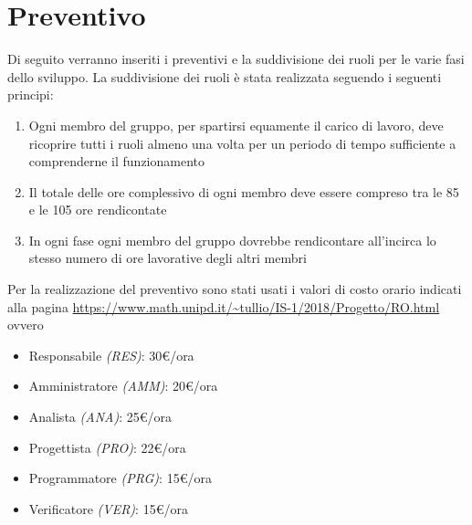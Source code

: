 	\section{Preventivo}
	Di seguito verranno inseriti i preventivi e la suddivisione dei ruoli per le varie fasi dello sviluppo. La suddivisione dei ruoli è stata realizzata seguendo i seguenti principi:
	\begin{enumerate}
		\item Ogni membro del gruppo, per spartirsi equamente il carico di lavoro, deve ricoprire tutti i ruoli almeno una volta per un periodo di tempo sufficiente a comprenderne il funzionamento
		\item Il totale delle ore complessivo di ogni membro deve essere compreso tra le 85 e le 105 ore rendicontate
		\item In ogni fase ogni membro del gruppo dovrebbe rendicontare all'incirca lo stesso numero di ore lavorative degli altri membri
	\end{enumerate} 
	Per la realizzazione del preventivo sono stati usati i valori di costo orario indicati alla pagina \url{https://www.math.unipd.it/~tullio/IS-1/2018/Progetto/RO.html} ovvero
	\begin{itemize}
		\item Responsabile \textit{(RES)}: 30\euro/ora
		\item Amministratore \textit{(AMM)}: 20\euro/ora
		\item Analista \textit{(ANA)}: 25\euro/ora
		\item Progettista \textit{(PRO)}: 22\euro/ora
		\item Programmatore \textit{(PRG)}: 15\euro/ora
		\item Verificatore \textit{(VER)}: 15\euro/ora
	\end{itemize}	
	
	
	\newpage
	
	\newpage
	
	\newpage
	
	\newpage
	
